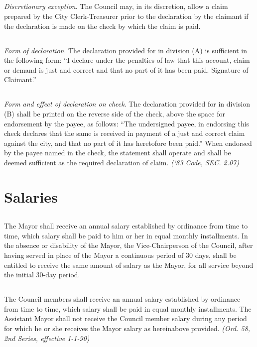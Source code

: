 \subsection{}
\emph{Discretionary exception}. The Council may, in its discretion, allow a claim prepared by the City Clerk-Treasurer prior to the declaration by the claimant if the declaration is made on the check by which the claim is paid.
\subsection{}
\emph{Form of declaration}. The declaration provided for in division (A) is sufficient in the following form: “I declare under the penalties of law that this account, claim or demand is just and correct and that no part of it has been paid. Signature of Claimant.”
\subsection{}
\emph{Form and effect of declaration on check}. The declaration provided for in division (B) shall be printed on the reverse side of the check, above the space for endorsement by the payee, as follows: “The undersigned payee, in endorsing this check declares that the same is received in payment of a just and correct claim against the city, and that no part of it has heretofore been paid.” When endorsed by the payee named in the check, the statement shall operate and shall be deemed sufficient as the required declaration of claim.\newline
\emph{(‘83 Code, SEC. 2.07)}



\section{Salaries}
\subsection{}
The Mayor shall receive an annual salary established by ordinance from time to time, which salary shall be paid to him or her in equal monthly installments.  In the absence or disability of the Mayor, the Vice-Chairperson of the Council, after having served in place of the Mayor a continuous period of 30 days, shall be entitled to receive the same amount of salary as the Mayor, for all service beyond the initial 30-day period.
\subsection{}
The Council members shall receive an annual salary established by ordinance from time to time, which salary shall be paid in equal monthly installments.  The Assistant Mayor shall not receive the Council member salary during any period for which he or she receives the Mayor salary as hereinabove provided.\newline
\emph{(Ord. 58, 2nd Series, effective 1-1-90)}
